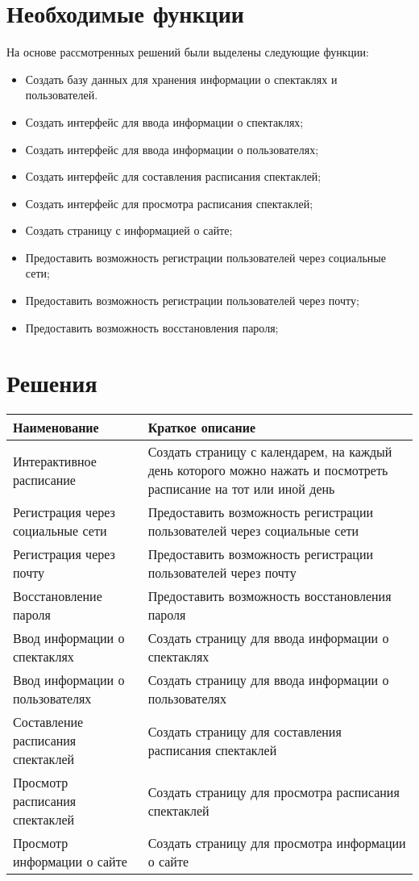 \section{Необходимые функции}
На основе рассмотренных решений были выделены следующие функции:
\begin{itemize}
	\item Создать базу данных для хранения информации о спектаклях и пользователей.
	\item Создать интерфейс для ввода информации о спектаклях;
	\item Создать интерфейс для ввода информации о пользователях;
	\item Создать интерфейс для составления расписания спектаклей;
	\item Создать интерфейс для просмотра расписания спектаклей;
	\item Создать страницу с информацией о сайте;
	\item Предоставить возможность регистрации пользователей через социальные сети;
	\item Предоставить возможность регистрации пользователей через почту;
	\item Предоставить возможность восстановления пароля;
\end{itemize}
\newpage

\section{Решения}

\begin{center}
	\begin{tabular}{|l|p{7 cm}|}
		\hline
		\textbf{Наименование} & \textbf{Краткое описание} \\ \hline
		Интерактивное расписание & Создать страницу с календарем, на каждый день которого можно нажать и посмотреть расписание  на тот или иной день \\ \hline
		Регистрация через социальные сети & Предоставить возможность регистрации пользователей через социальные сети \\ \hline
		Регистрация через почту & Предоставить возможность регистрации пользователей через почту \\ \hline
		Восстановление пароля & Предоставить возможность восстановления пароля \\ \hline
		Ввод информации о спектаклях & Создать страницу для ввода информации о спектаклях \\ \hline
		Ввод информации о пользователях & Создать страницу для ввода информации о пользователях \\ \hline
		Составление расписания спектаклей & Создать страницу для составления расписания спектаклей \\ \hline
		Просмотр расписания спектаклей & Создать страницу для просмотра расписания спектаклей \\ \hline
		Просмотр информации о сайте & Создать страницу для просмотра информации о сайте \\ \hline
	\end{tabular}
\end{center}
\newpage

